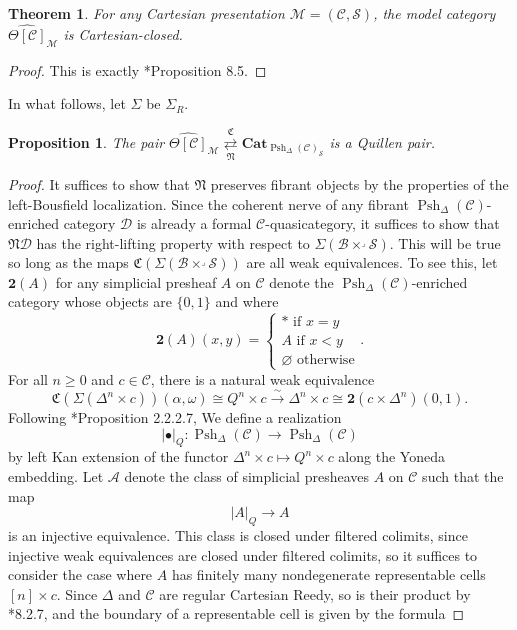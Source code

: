 \documentclass[a4paper]{article}
\numberwithin{equation}{subsection}
\theoremstyle{plain}   %
\newtheorem{thm}[equation]{Theorem}
\newtheorem{prop}[equation]{Proposition}
\theoremstyle{definition}
\theoremstyle{remark}
\theoremstyle{plain}
\newcommand{\Cat}{\ensuremath{\mathbf{Cat}}}
\newcommand{\realiz}[1]{\ensuremath{\left\lvert#1\right\rvert}}
\providecommand{\C}{}
\renewcommand{\C}{\ensuremath{\mathcal{C}}}
\newcommand{\M}{\ensuremath{\mathcal{M}}}
\newcommand{\setS}{\ensuremath{\mathscr{S}}}
\newcommand{\cellset}{\ensuremath{\widehat{\Theta[\mathcal{C}]}}}
\newcommand{\spsh}{\ensuremath{\operatorname{Psh}_\Delta(\mathcal{C})}}
\begin{document}
\begin{thm} For any Cartesian presentation \(\M=(\C,\setS)\), the model category \(\cellset_{\M}\) is Cartesian-closed.  
\end{thm}
\begin{proof}
  This is exactly \cite{rezk-theta-n-spaces}*{Proposition 8.5}.
\end{proof}

In what follows, let \(\Sigma\) be \(\Sigma_R\).  

\begin{prop} The pair \(\cellset_\M \underset{\mathfrak{N}}{\overset{\mathfrak{C}}{\rightleftarrows}} \Cat_{\spsh_{\setS}}\) is a Quillen pair.
\end{prop}
\begin{proof}
  It suffices to show that \(\mathfrak{N}\) preserves fibrant objects by the properties of the left-Bousfield localization.  Since the coherent nerve of any fibrant \(\spsh\)-enriched category \(\mathcal{D}\) is already a formal \(\C\)-quasicategory, it suffices to show that \(\mathfrak{N}\mathcal{D}\) has the right-lifting property with respect to \(\Sigma(\mathscr{B}\times^\lrcorner \setS)\).  This will be true so long as the maps \(\mathfrak{C}(\Sigma(\mathscr{B}\times^\lrcorner \setS))\) are all weak equivalences.  To see this, let \(\mathbf{2}(A)\) for any simplicial presheaf \(A\) on \(\C\) denote the \(\spsh\)-enriched category whose objects are \(\{0,1\}\) and where 
  \[
    \mathbf{2}(A)(x,y)=
    \begin{cases}
      \ast \text{ if } x=y\\
      A \text{ if } x<y\\
      \varnothing \text{ otherwise}
    \end{cases}. 
  \]
  For all \(n \geq 0\) and \(c \in \C\), there is a natural weak equivalence 
  \[\mathfrak{C}(\Sigma(\Delta^n \times c))(\alpha,\omega) \cong Q^n \times c \xrightarrow{\sim} \Delta^n \times c \cong \mathbf{2}(c\times \Delta^n)(0,1).\] 
  Following \cite{htt}*{Proposition 2.2.2.7}, We define a realization 
  \[\realiz{\bullet}_{Q}:\spsh\to \spsh\] 
  by left Kan extension of the functor \(\Delta^n\times c \mapsto Q^n \times c\) along the Yoneda embedding. Let \(\mathcal{A}\) denote the class of simplicial presheaves \(A\) on \(\C\) such that the map
  \[\realiz{A}_Q \to A\]
  is an injective equivalence.  This class is closed under filtered colimits, since injective weak equivalences are closed under filtered colimits, so it suffices to consider the case where \(A\) has finitely many nondegenerate representable cells \([n] \times c\).  Since \(\Delta\) and \(\C\) are regular Cartesian Reedy, so is their product by \cite{cisinski-book}*{8.2.7}, and the boundary of a representable cell is given by the formula 

\end{proof}
\end{document}
